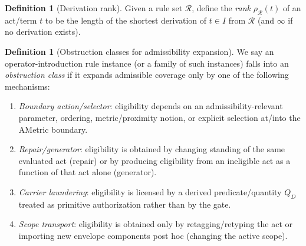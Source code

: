 \documentclass[11pt]{article}
\theoremstyle{definition}
\newtheorem{definition}[theorem]{Definition}
\begin{document}
\begin{definition}[Derivation rank]
\label{def:rank}
Given a rule set $\mathcal{R}$, define the \emph{rank} $\rho_{\mathcal{R}}(t)$ of an act/term $t$ to be the length of the shortest derivation of $t\in I$ from $\mathcal{R}$ (and $\infty$ if no derivation exists).
\end{definition}

\begin{definition}[Obstruction classes for admissibility expansion]
\label{def:obstruction-classes}
We say an operator-introduction rule instance (or a family of such instances) falls into an \emph{obstruction class} if it expands admissible coverage only by one of the following mechanisms:
\begin{enumerate}[label=\textbf{(E\arabic*)}, leftmargin=2.6em]
\item \emph{Boundary action/selector}: eligibility depends on an admissibility-relevant parameter, ordering, metric/proximity notion, or explicit selection at/into the AMetric boundary.
\item \emph{Repair/generator}: eligibility is obtained by changing standing of the same evaluated act (repair) or by producing eligibility from an ineligible act as a function of that act alone (generator).
\item \emph{Carrier laundering}: eligibility is licensed by a derived predicate/quantity $Q_D$ treated as primitive authorization rather than by the gate.
\item \emph{Scope transport}: eligibility is obtained only by retagging/retyping the act or importing new envelope components post hoc (changing the active scope).
\end{enumerate}
\end{definition}
\end{document}
